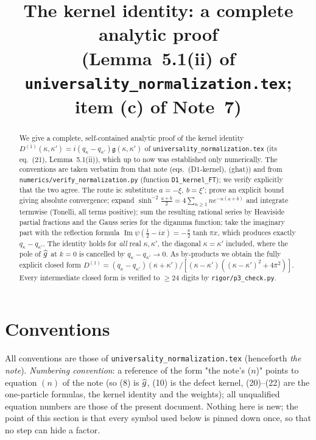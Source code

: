 \documentclass[11pt]{article}
\title{The kernel identity: a complete analytic proof\\[2pt]
\large (Lemma~5.1(ii) of \texttt{universality\_normalization.tex}; item (c) of Note~7)}
\author{}\date{}
\newcommand{\gfr}{\mathfrak g}\newcommand{\Dt}{\widetilde D^{(1)}}\newcommand{\psih}{\psi}
\begin{document}
\maketitle

\begin{abstract}\noindent
We give a complete, self-contained analytic proof of the kernel identity
\(D^{(1)}(\kappa,\kappa')=i(q_\kappa-q_{\kappa'})\gfr(\kappa,\kappa')\)
of \texttt{universality\_normalization.tex} (its eq.~(21), Lemma~5.1(ii)), which up to now was
established only numerically.  The conventions are taken verbatim from that note
(eqs.~(D1-kernel), (ghat)) and from \texttt{numerics/verify\_normalization.py} (function
\texttt{D1\_kernel\_FT}); we verify explicitly that the two agree.  The route is: substitute
\(a=-\xi,\ b=\xi'\); prove an explicit bound giving absolute convergence; expand
\(\sinh^{-2}\frac{a+b}2=4\sum_{n\ge1}ne^{-n(a+b)}\) and integrate termwise (Tonelli, all terms
positive); sum the resulting rational series by Heaviside partial fractions and the Gauss series
for the digamma function; take the imaginary part with the reflection formula
\(\operatorname{Im}\psi(\frac12-ix)=-\frac\pi2\tanh\pi x\), which produces exactly
\(q_\kappa-q_{\kappa'}\).  The identity holds for \emph{all} real \(\kappa,\kappa'\), the diagonal
\(\kappa=\kappa'\) included, where the pole of \(\widehat g\) at \(k=0\) is cancelled by
\(q_\kappa-q_{\kappa'}\to0\).  As by-products we obtain the fully explicit closed form
\(D^{(1)}=(q_\kappa-q_{\kappa'})(\kappa+\kappa')/[(\kappa-\kappa')((\kappa-\kappa')^2+4\pi^2)]\).
Every intermediate closed form is verified to \(\ge24\) digits by \texttt{rigor/p3\_check.py}.
\end{abstract}

\tableofcontents

\section{Conventions}\label{sec:conv}

All conventions are those of \texttt{universality\_normalization.tex} (henceforth \emph{the note}).
\emph{Numbering convention}: a reference of the form "the note's (\(n\))" points to equation
\((n)\) of the note (so (8) is \(\widehat g\), (10) is the defect kernel, (20)--(22) are the one-particle
formulas, the kernel identity and the weights); all unqualified equation numbers are those of the
present document.  Nothing here is new; the point of this section
is that every symbol used below is pinned down once, so that no step can hide a factor.
\end{document}
